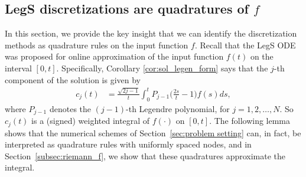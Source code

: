 \documentclass{article}
\theoremstyle{definition}
\begin{document}






\subsection{LegS discretizations are quadratures of $f$} \label{subsec:legs is quadrature}
In this section, we provide the key insight that we can identify the discretization methods as quadrature rules on the input function $f$. 
Recall that the LegS ODE was proposed for online approximation of the input function $f(t)$ on the interval $[0,t]$.
Specifically, Corollary \ref{cor:sol_legen_form} says that the $j$-th component of the solution is given by
\begin{align*}
c_j(t) &= \frac{\sqrt{2j-1}}{t} \int_0^t P_{j-1} \Big(\frac{2s}{t} - 1 \Big) f(s) ds,
\end{align*}
where $P_{j-1}$ denotes the $(j-1)$-th Legendre polynomial, for $j=1,2,\dots,N$.
So $c_j(t)$ is a (signed) weighted integral of $f(\cdot)$ on $[0,t]$. The following lemma shows that the numerical schemes of Section~\ref{sec:problem setting} can, in fact, be interpreted as quadrature rules with uniformly spaced nodes, and in Section~\ref{subsec:riemann_f}, we show that these quadratures approximate the integral.


\end{document}
